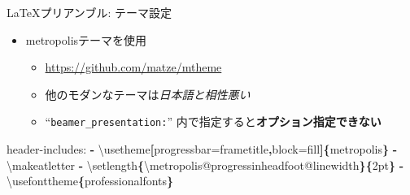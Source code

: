 \documentclass[14pt,ignorenonframetext,]{beamer}
\newenvironment{Shaded}{\begin{snugshade}}{\end{snugshade}}
\newcommand{\FunctionTok}[1]{\textcolor[rgb]{0.00,0.00,0.00}{#1}}
\newcommand{\KeywordTok}[1]{\textcolor[rgb]{0.13,0.29,0.53}{\textbf{#1}}}
\newcommand{\NormalTok}[1]{#1}
\providecommand{\tightlist}{%
  \setlength{\itemsep}{0pt}\setlength{\parskip}{0pt}}
\begin{document}
\begin{frame}[fragile]{\LaTeX プリアンブル: テーマ設定}
\protect\hypertarget{ux30d7ux30eaux30a2ux30f3ux30d6ux30eb-ux30c6ux30fcux30deux8a2dux5b9a}{}

\begin{itemize}
\tightlist
\item
  metropolisテーマを使用

  \begin{itemize}
  \tightlist
  \item
    \url{https://github.com/matze/mtheme}
  \item
    他のモダンなテーマは\emph{日本語と相性悪い}
  \item
    ``\texttt{beamer\_presentation:}''
    内で指定すると\textbf{オプション指定できない}
  \end{itemize}
\end{itemize}

\begin{Shaded}
\begin{Highlighting}[]
\FunctionTok{header-includes:}
  \KeywordTok{-}\NormalTok{ \textbackslash{}usetheme}\KeywordTok{[}\NormalTok{progressbar=frametitle}\KeywordTok{,}\NormalTok{block=fill}\KeywordTok{]\{}\NormalTok{metropolis}\KeywordTok{\}}
  \KeywordTok{-}\NormalTok{ \textbackslash{}makeatletter}
  \KeywordTok{-}\NormalTok{ \textbackslash{}setlength}\KeywordTok{\{}\NormalTok{\textbackslash{}metropolis@progressinheadfoot@linewidth}\KeywordTok{\}\{}\NormalTok{2pt}\KeywordTok{\}}
  \KeywordTok{-}\NormalTok{ \textbackslash{}usefonttheme}\KeywordTok{\{}\NormalTok{professionalfonts}\KeywordTok{\}}
\end{Highlighting}
\end{Shaded}

\end{frame}
\end{document}

